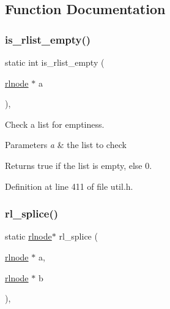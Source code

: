 \subsection{Function Documentation}
\mbox{\label{group__rlists_gaf60549214daf0df46bcd1a0d5ba5b661}} 
\subsubsection{\texorpdfstring{is\+\_\+rlist\+\_\+empty()}{is\_rlist\_empty()}}
{\footnotesize\ttfamily static int is\+\_\+rlist\+\_\+empty (\begin{DoxyParamCaption}\item[{\hyperlink{group__rlists_ga8f6244877f7ce2322c90525217ea6e7a}{rlnode} $\ast$}]{a }\end{DoxyParamCaption})\hspace{0.3cm}{\ttfamily [inline]}, {\ttfamily [static]}}



Check a list for emptiness. 


\begin{DoxyParams}{Parameters}
{\em a} & the list to check \\
\hline
\end{DoxyParams}
\begin{DoxyReturn}{Returns}
true if the list is empty, else 0. 
\end{DoxyReturn}


Definition at line 411 of file util.\+h.

\mbox{\label{group__rlists_gac04dfecc68239457f673c0a63c254541}} 
\subsubsection{\texorpdfstring{rl\+\_\+splice()}{rl\_splice()}}
{\footnotesize\ttfamily static \hyperlink{group__rlists_ga8f6244877f7ce2322c90525217ea6e7a}{rlnode}$\ast$ rl\+\_\+splice (\begin{DoxyParamCaption}\item[{\hyperlink{group__rlists_ga8f6244877f7ce2322c90525217ea6e7a}{rlnode} $\ast$}]{a,  }\item[{\hyperlink{group__rlists_ga8f6244877f7ce2322c90525217ea6e7a}{rlnode} $\ast$}]{b }\end{DoxyParamCaption})\hspace{0.3cm}{\ttfamily [inline]}, {\ttfamily [static]}}



